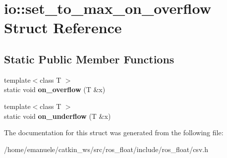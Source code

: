 \hypertarget{structio_1_1set__to__max__on__overflow}{}\section{io\+:\+:set\+\_\+to\+\_\+max\+\_\+on\+\_\+overflow Struct Reference}
\label{structio_1_1set__to__max__on__overflow}
\subsection*{Static Public Member Functions}
\begin{DoxyCompactItemize}
\item 
\mbox{\label{structio_1_1set__to__max__on__overflow_a770dee97a1ee55131163e6be8d4c0d9d}} 
{\footnotesize template$<$class T $>$ }\\static void {\bfseries on\+\_\+overflow} (T \&x)
\item 
\mbox{\label{structio_1_1set__to__max__on__overflow_a812d316e2b23247df19ca83bfda90a59}} 
{\footnotesize template$<$class T $>$ }\\static void {\bfseries on\+\_\+underflow} (T \&x)
\end{DoxyCompactItemize}


The documentation for this struct was generated from the following file\+:\begin{DoxyCompactItemize}
\item 
/home/emanuele/catkin\+\_\+ws/src/ros\+\_\+float/include/ros\+\_\+float/csv.\+h\end{DoxyCompactItemize}
